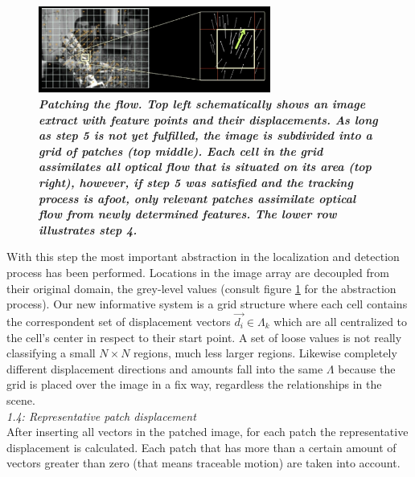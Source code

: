 \documentclass[conference]{IEEEtran}
\begin{document}
\begin{figure}
	\begin{center}
		\includegraphics[width=3in]{imgs/method/step1to4.ps}
		\caption[Patching the flow. ]{\textbf{\textit{Patching the flow. Top left schematically shows an image extract with feature points and their displacements. As long as step 5 is not yet fulfilled, the image is subdivided into a grid of patches (top middle). Each cell in the grid assimilates all optical flow that is situated on its area (top right), however, if step 5 was satisfied and the tracking process is afoot, only relevant patches assimilate optical flow from newly determined features. The lower row illustrates step 4. }}}
		\label{fig:abstraction}
	\end{center}
\end{figure}
%
With this step the most important abstraction in the localization and detection process has been performed. Locations in the image array are decoupled from their original domain, the grey-level values (consult figure \ref{fig:abstraction} for the abstraction process). Our new informative system is a grid structure where each cell contains the correspondent set of displacement vectors $ \vec{d_i} \in \Lambda_k $ which are all centralized to the cell's center in respect to their start point. A set of loose values is not really classifying a small $ N \times N $ regions, much less larger regions. Likewise completely different displacement directions and amounts fall into the same $ \Lambda $ because the grid is placed over the image in a fix way, regardless the relationships in the scene.\\ \newline
%
\textit{1.4: Representative patch displacement} \\ \newline
After inserting all vectors in the patched image, for each patch the representative displacement is calculated. Each patch that has more than a certain amount of vectors greater than zero (that means traceable motion) are taken into account.
\end{document}
